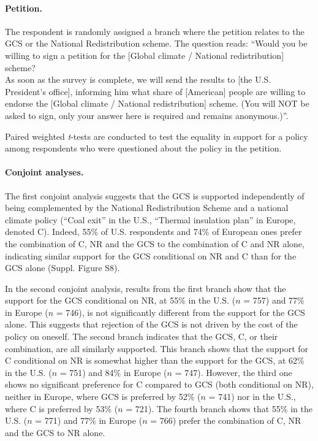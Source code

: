 \begin{small}
\paragraph{\small Petition.}
The respondent is randomly assigned a branch where the petition relates to the GCS or the National Redistribution scheme. The question reads: ``Would you be willing to sign a petition for the [Global climate / National redistribution] scheme? \\ As soon as the survey is complete, we will send the results to [the U.S. President's office], informing him what share of [American] people are willing to endorse the [Global climate / National redistribution] scheme. (You will NOT be asked to sign, only your answer here is required and remains anonymous.)''. 

Paired weighted \textit{t}-tests are conducted to test the equality in support for a policy among respondents who were questioned about the policy in the petition. 

\paragraph{\small Conjoint analyses.}
The first conjoint analysis suggests that the GCS is supported independently of being complemented by the National Redistribution Scheme and a national climate policy (``Coal exit'' in the U.S., ``Thermal insulation plan'' in Europe, denoted C). Indeed, 55\% of %
U.S. respondents and 74\% of %
European ones prefer the combination of C, NR and the GCS to the combination of C and NR alone, indicating similar support for the GCS conditional on NR and C than for the GCS alone (Suppl. Figure S8). %

In the second conjoint analysis, results from the first branch show that the support for the GCS conditional on NR, at 55\% in the U.S. ($n$ = 757) and 77\% in Europe ($n$ = 746), is not significantly different from the support for the GCS alone. This suggests that rejection of the GCS is not driven by the cost of the policy on oneself. The second branch indicates that the GCS, C, or their combination, are all similarly supported. This branch shows that the support for C conditional on NR is somewhat higher than the support for the GCS, at 62\% in the U.S. ($n$ = 751) and 84\% in Europe ($n$ = 747). However, the third one shows no significant preference for C compared to GCS (both conditional on NR), neither in Europe, where GCS is preferred by 52\% ($n$ = 741) nor in the U.S., where C is preferred by 53\% ($n$ = 721). The fourth branch shows that 55\% in the U.S. ($n$ = 771) and 77\% in Europe ($n$ = 766) prefer the combination of C, NR and the GCS to NR alone.


\end{small}
